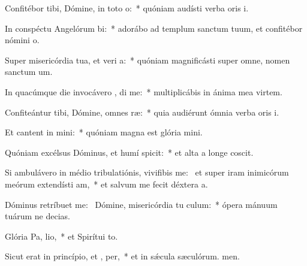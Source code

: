 \item Confitébor tibi, Dómine, in toto  o:~* quóniam audísti verba oris i.
\item In conspéctu Angelórum  bi:~* adorábo ad templum sanctum tuum, et confitébor nómini o.
\item Super misericórdia tua, et veri a:~* quóniam magnificásti super omne, nomen sanctum um.
\item In quacúmque die invocávero , di me:~* multiplicábis in ánima mea virtem.
\item Confiteántur tibi, Dómine, omnes  ræ:~* quia audiérunt ómnia verba oris i.
\item Et cantent in  mini:~* quóniam magna est glória mini.
\item Quóniam excélsus Dóminus, et humí spicit:~* et alta a longe coscit.
\item Si ambulávero in médio tribulatiónis, vivifibis me:~\pscross{} et super iram inimicórum meórum extendísti  am,~* et salvum me fecit déxtera a.
\item Dóminus retríbuet  me:~\pscross{} Dómine, misericórdia tu  culum:~* ópera mánuum tuárum ne decias.
\item Glória Pa,  lio,~* et Spirítui to.
\item Sicut erat in princípio, et ,  per,~* et in sǽcula sæculórum. men.
